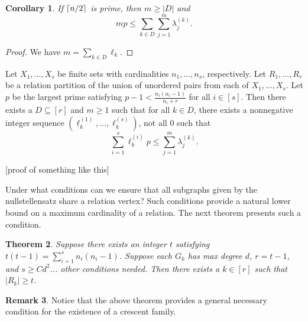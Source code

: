 \documentclass[12pt]{article}
\DeclarePairedDelimiter\ceil{\lceil}{\rceil}
\newtheorem{thm}{Theorem}[section] %
\newtheorem{cor}[thm]{Corollary}
\theoremstyle{definition}
\newtheorem{rem}[thm]{Remark}
\begin{document}
	\begin{cor}
		If $\ceil{n/2}$ is prime, then $m \geq |D|$ and 
		$$m p \leq \sum_{k \in D}\sum_{j =1}^{m}\lambda_j^{(k)}.$$
	\end{cor}
	\begin{proof}
		We have $m = \sum_{k \in D}\ell_k$.
	\end{proof}
	
	Let $X_1, \ldots, X_s$ be finite sets with cardinalities $n_1,\ldots, n_s$, respectively.  Let $R_1, \ldots, R_r$ be a relation partition of the union of unordered pairs from each of $X_1, \ldots, X_s$.  Let $p$ be the largest prime satisfying $p-1 < \tfrac{n_i(n_i-1)}{n_i+r}$ for all $i \in [s]$.  Then there exists a $D \subseteq [r]$ and $m \geq 1$ such that for all $k \in D$, there exists a nonnegative integer sequence $(\ell_k^{(1)}, \ldots, \ell_k^{(s)})$, not all $0$ such that
	$$ \sum_{i = 1}^s\ell_k^{(i)}p \leq \sum_{j=1}^m \lambda_j^{(k)}.$$
	
	[proof of something like this]
	
	Under what conditions can we ensure that all subgraphs given by the nullstellensatz share a relation vertex?  Such conditions provide a natural lower bound on a maximum cardinality of a relation.  The next theorem presents such a condition.
	
	\begin{thm}
		Suppose there exists an integer $t$ satisfying $t(t-1) = \sum_{i=1}^s n_i(n_i-1)$.  Suppose each $G_k$ has max degree $d$, $r = t-1$, and $s \geq Cd^2$... other conditions needed.  Then there exists a $k \in [r]$ such that $|R_k| \geq t$.
	\end{thm}

	\begin{rem}
		Notice that the above theorem provides a general necessary condition for the existence of a crescent family.
	\end{rem}
	
\end{document}
